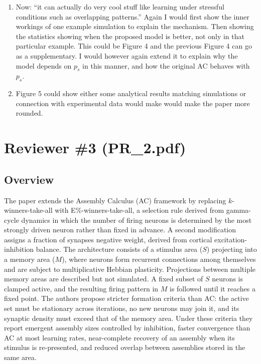 \documentclass[a4paper, 11pt]{article}
\begin{document}
\begin{enumerate}
    \item Now: ``it can actually do very cool stuff like learning under stressful conditions such as overlapping patterns.'' Again I would first show the inner workings of one example simulation to explain the mechanism. Then showing the statistics showing when the proposed model is better, not only in that particular example. This could be Figure 4 and the previous Figure 4 can go as a supplementary. I would however again extend it to explain why the model depends on $p_s$ in this manner, and how the original AC behaves with $p_s$. 
    
    \item Figure 5 could show either some analytical results matching simulations or connection with experimental data would make would make the paper more rounded.
\end{enumerate}


\section*{Reviewer \#3 (PR\_2.pdf)}

\subsection*{Overview}
The paper extends the Assembly Calculus (AC) framework by replacing $k$-winners-take-all with E\%-winners-take-all, a selection rule derived from gamma-cycle dynamics in which the number of firing neurons is determined by the most strongly driven neuron rather than fixed in advance. A second modification assigns a fraction of synapses negative weight, derived from cortical excitation-inhibition balance. The architecture consists of a stimulus area ($S$) projecting into a memory area ($M$), where neurons form recurrent connections among themselves and are subject to multiplicative Hebbian plasticity. Projections between multiple memory areas are described but not simulated. A fixed subset of $S$ neurons is clamped active, and the resulting firing pattern in $M$ is followed until it reaches a fixed point. The authors propose stricter formation criteria than AC: the active set must be stationary across iterations, no new neurons may join it, and its synaptic density must exceed that of the memory area. Under these criteria they report emergent assembly sizes controlled by inhibition, faster convergence than AC at most learning rates, near-complete recovery of an assembly when its stimulus is re-presented, and reduced overlap between assemblies stored in the same area.
\end{document}
